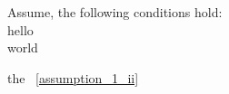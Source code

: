 \begin{asu}
  \label{assumption_1}
  Assume, the following conditions hold:
  \\
  \subasu \label{assumption_1_i} hello
  \\
  \subasu \label{assumption_1_ii} world
\end{asu}


the ~\ref{assumption_1_ii}

